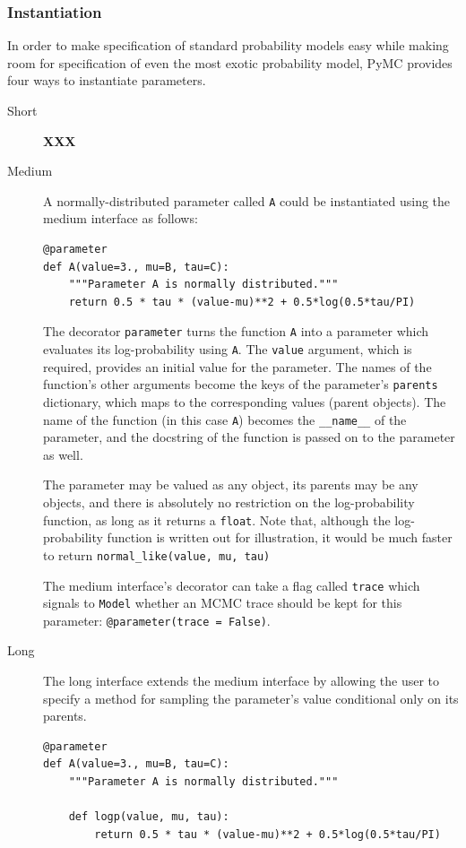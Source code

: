 \documentclass[]{book}
\begin{document}
\subsubsection{Instantiation}
In order to make specification of standard probability models easy while making room for specification of even the most exotic probability model, PyMC provides four ways to instantiate parameters.
\begin{description}
    \item[Short] \textbf{XXX}
    \item[Medium] A normally-distributed parameter called \texttt{A} could be instantiated using the medium interface as follows:
    \begin{verbatim}
@parameter
def A(value=3., mu=B, tau=C):
    """Parameter A is normally distributed."""
    return 0.5 * tau * (value-mu)**2 + 0.5*log(0.5*tau/PI)
    \end{verbatim}
    The decorator \texttt{parameter} turns the function \texttt{A} into a parameter which evaluates its log-probability using \texttt{A}. The \texttt{value} argument, which is required, provides an initial value for the parameter. The names of the function's other arguments become the keys of the parameter's \texttt{parents} dictionary, which maps to the corresponding values (parent objects). The name of the function (in this case \texttt{A}) becomes the \texttt{\_\_name\_\_} of the parameter, and the docstring of the function is passed on to the parameter as well.

    The parameter may be valued as any object, its parents may be any objects, and there is absolutely no restriction on the log-probability function, as long as it returns a \texttt{float}. Note that, although the log-probability function is written out for illustration, it would be much faster to return \texttt{normal\_like(value, mu, tau)}

    The medium interface's decorator can take a flag called \texttt{trace} which signals to \texttt{Model} whether an MCMC trace should be kept for this parameter: \texttt{@parameter(trace = False)}.
    \item[Long] The long interface extends the medium interface by allowing the user to specify a method for sampling the parameter's value conditional only on its parents.
    \begin{verbatim}
@parameter
def A(value=3., mu=B, tau=C):
    """Parameter A is normally distributed."""

    def logp(value, mu, tau):
        return 0.5 * tau * (value-mu)**2 + 0.5*log(0.5*tau/PI)


\end{verbatim}
\end{description}
\end{document}
